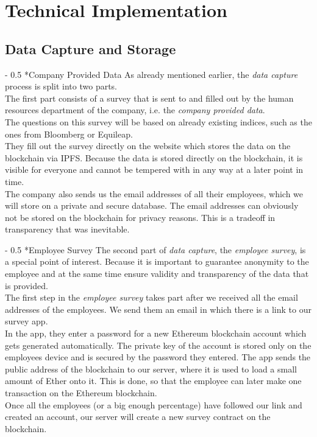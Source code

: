 \documentclass[portrait,a4paper]{article}
\makeatletter
\renewcommand\paragraph{\@startsection{paragraph}{4}{0mm}%
	{-\baselineskip}%
	{0.5\baselineskip}%
	{\normalfont\bfseries}%
}%
\makeatother
\begin{document}
			
\section{Technical Implementation}
	
	\subsection{Data Capture and Storage}
		\paragraph*{Company Provided Data}
			As already mentioned earlier, the \textit{data capture} process is split into two parts.\\
			The first part consists of a survey that is sent to and filled out by the human resources 
			department of the company, i.e. the \textit{company provided data}.\\
			The questions on this survey will be based on already existing indices, 
			such as the ones from Bloomberg or Equileap.\\
			They fill out the survey directly on the website which stores the data on the blockchain via IPFS. 
			Because the data is stored directly on the blockchain, it is visible for everyone and 
			cannot be tempered with in any way at a later point in time.\\
			The company also sends us the email addresses of all their employees, which we will store 
			on a private and secure database. The email addresses can obviously not be stored on the 
			blockchain for privacy reasons. This is a tradeoff in transparency that was inevitable.

		\paragraph*{Employee Survey}
			The second part of \textit{data capture}, the \textit{employee survey}, is a special point of interest. 
			Because it is important to guarantee anonymity to the employee and at the same time ensure 
			validity and transparency of the data that is provided.\\

			The first step in the \textit{employee survey} takes part after we received all the email 
			addresses of the employees. We send them an email in which there is a link to our survey app.\\
			In the app, they enter a password for a new Ethereum blockchain account which gets 
			generated automatically. The private key of the account is stored only on the 
			employees device and is secured by the password they entered. The app sends the public address of the 
			blockchain to our server, where it is used to load a small amount of Ether onto it. 
			This is done, so that the employee can later make one transaction on the Ethereum blockchain.\\
			Once all the employees (or a big enough percentage) have followed our link and created an account, 
			our server will create a new survey contract on the blockchain.\\
\end{document}
